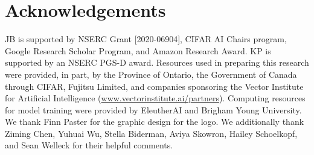 \section*{Acknowledgements}

JB is supported by NSERC Grant [2020-06904], CIFAR AI Chairs program, Google Research Scholar Program, and Amazon Research Award. KP is supported by an NSERC PGS-D award. Resources used in preparing this research were provided, in part, by the Province of Ontario, the Government of Canada through CIFAR, Fujitsu Limited, and companies sponsoring the Vector Institute for Artificial Intelligence (\url{www.vectorinstitute.ai/partners}). Computing resources for model training were provided by EleutherAI and Brigham Young University. We thank Finn Paster for the graphic design for the logo. We additionally thank Ziming Chen, Yuhuai Wu, Stella Biderman, Aviya Skowron, Hailey Schoelkopf, and Sean Welleck for their helpful comments.